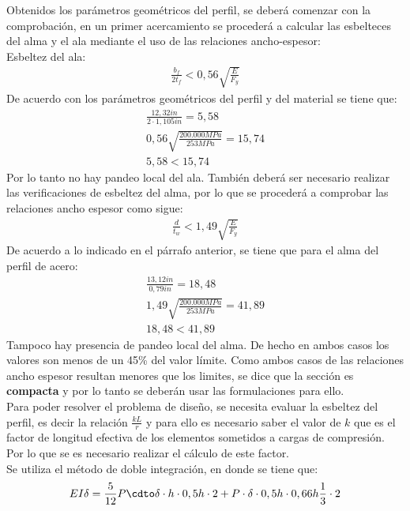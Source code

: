 \begin{example}
\begin{table}[h!]
\end{table}
Obtenidos los parámetros geométricos del perfil, se deberá comenzar con la comprobación, en un primer acercamiento se procederá a calcular las esbelteces del alma y el ala mediante el uso de las relaciones ancho-espesor:\\
Esbeltez del ala:\\
\begin{align*}
\frac{b_{f}}{2t_f}<0,56\sqrt{\frac{E}{F_y}}
\end{align*}
De acuerdo con los parámetros geométricos del perfil y del material se tiene que:
\begin{align*}
    \frac{12,32in}{2\cdot 1,105in}=5,58\\
    0,56\sqrt{\frac{200.000MPa}{253MPa}}=15,74\\
    5,58<15,74
\end{align*}
Por lo tanto no hay pandeo local del ala.
También deberá ser necesario realizar las verificaciones de esbeltez del alma, por lo que se procederá a comprobar las relaciones ancho espesor como sigue:
\begin{align*}
    \frac{d}{t_w}<1,49\sqrt{\frac{E}{F_y}}
\end{align*}
De acuerdo a lo indicado en el párrafo anterior, se tiene que para el alma del perfil de acero:
\begin{gather*}
    \frac{13,12in}{0,79in}=18,48\\
    1,49\sqrt{\frac{200.000MPa}{253MPa}}=41,89\\
    18,48<41,89
\end{gather*}
Tampoco hay presencia de pandeo local del alma. De hecho en ambos casos los valores son menos de un 45\% del valor límite.
Como ambos casos de las relaciones ancho espesor resultan menores que los limites, se dice que la sección es \textbf{compacta} y por lo tanto se deberán usar las formulaciones para ello.\\
Para poder resolver el problema de diseño, se necesita evaluar la esbeltez del perfil, es decir la relación $\frac{kL}{r}$ y para ello es necesario saber el valor de $k$ que es el factor de longitud efectiva de los elementos sometidos a cargas de compresión. Por lo que se es necesario realizar el cálculo de este factor.\\
Se utiliza el método de doble integración, en donde se tiene que:\\
\begin{align*}
    EI\delta&=\frac{5}{12}P\cdto\delta\cdot h\cdot 0,5h\cdot 2+P\cdot\delta\cdot 0,5h\cdot 0,66h\frac{1}{3}\cdot2\\

\end{align*}
\end{example}
